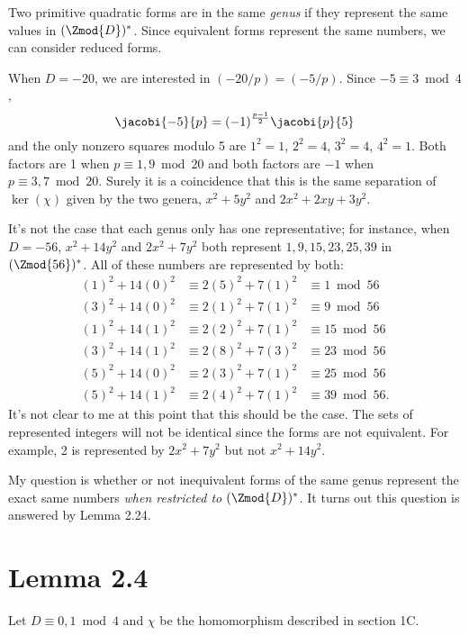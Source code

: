 Two primitive quadratic forms are in the same \emph{genus} if they represent the same values in $(\Zmod{D})^*$. Since equivalent forms represent the same numbers, we can consider reduced forms.

When $D=-20$, we are interested in $(-20/p) = (-5/p)$. Since $-5\equiv 3\bmod 4$,
\[\jacobi{-5}{p}=(-1)^\frac{p-1}{2}\jacobi{p}{5}\]
and the only nonzero squares modulo 5 are $1^2=1$, $2^2=4$, $3^2=4$, $4^2=1$. Both factors are 1 when $p\equiv 1, 9\bmod 20$ and both factors are $-1$ when $p\equiv 3, 7\bmod 20$. Surely it is a coincidence that this is the same separation of $\ker(\chi)$ given by the two genera, $x^2+5y^2$ and $2x^2+2xy+3y^2$.

It's not the case that each genus only has one representative; for instance, when $D=-56$, $x^2+14y^2$ and $2x^2+7y^2$ both represent $1, 9, 15, 23, 25, 39$ in $(\Zmod{56})^*$. All of these numbers are represented by both:
\begin{align*}
(1)^2 + 14(0)^2 &\equiv 2(5)^2+7(1)^2 &\equiv 1\bmod 56\\
(3)^2 + 14(0)^2 &\equiv 2(1)^2+7(1)^2 &\equiv 9\bmod 56\\
(1)^2 + 14(1)^2 &\equiv 2(2)^2+7(1)^2 &\equiv 15\bmod 56\\
(3)^2 + 14(1)^2 &\equiv 2(8)^2+7(3)^2 &\equiv 23\bmod 56\\
(5)^2 + 14(0)^2 &\equiv 2(3)^2+7(1)^2 &\equiv 25\bmod 56\\
(5)^2 + 14(1)^2 &\equiv 2(4)^2+7(1)^2 &\equiv 39\bmod 56.
\end{align*}
It's not clear to me at this point that this should be the case. The sets of represented integers will not be identical since the forms are not equivalent. For example, 2 is represented by $2x^2+7y^2$ but not $x^2+14y^2$.

My question is whether or not inequivalent forms of the same genus represent the exact same numbers \emph{when restricted to $(\Zmod{D})^*$}. It turns out this question is answered by Lemma 2.24.

\section{Lemma 2.4}

Let $D\equiv 0,1\bmod 4$ and $\chi$ be the homomorphism described in section 1C.

